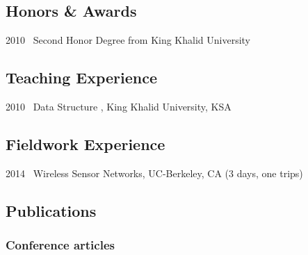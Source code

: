 \documentclass[12pt,]{scrartcl}
\begin{document}




\subsection{Honors \& Awards}

2010 \, Second Honor Degree from King Khalid University \\



\subsection{Teaching Experience}

2010 \, Data Structure , King Khalid University, KSA \\



\subsection{Fieldwork Experience}

2014 \, Wireless Sensor Networks, UC-Berkeley, CA (3 days, one trips) \\


\subsection{Publications}


\subsubsection{Conference articles}
\end{document}
